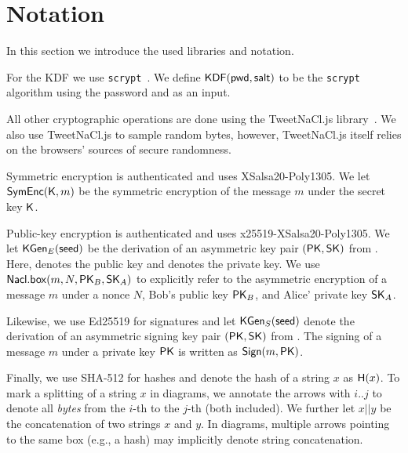 \section{Notation}
\label{sec:notation}

In this section we introduce the used libraries and notation.

For the \ac{KDF} we use \texttt{scrypt}~\cite{Percival2009}.
We define $\myKDF{\mypwd}{\mySalt}$ to be the \texttt{scrypt} algorithm using the password \mypwd and \mySalt as an input.

All other cryptographic operations are done using the TweetNaCl.js library~\cite{Bernstein2015,Chestnykhm2016}.
We also use TweetNaCl.js to sample random bytes, however, TweetNaCl.js itself relies on the browsers' sources of secure randomness.

Symmetric encryption is authenticated and uses XSalsa20-Poly1305.
We let $\mySymEnc{\mySymKey}{m}$ be the symmetric encryption of the message $m$ under the secret key $\mySymKey$.

Public-key encryption is authenticated and uses x25519-XSalsa20-Poly1305.
We let $\myKGen[_E]{\myseed}$ be the derivation of an asymmetric key pair $\myKeyPair{}$  from \myseed.
Here, \myPK denotes the public key and \mySK denotes the private key.
We use $\myAlgofont{Nacl.box}(m, N, \myPK_B, \mySK_A)$ to explicitly refer to the asymmetric encryption of a message $m$ under a nonce $N$, Bob's public key $\myPK_B$, and Alice' private key $\mySK_A$.

Likewise, we use Ed25519 for signatures and let $\myKGen[_S]{\myseed}$ denote the derivation of an asymmetric signing key pair $\myKeyPair{}$  from \myseed.
The signing of a message $m$ under a private key $\myPK$ is written as $\mySign{m}{\myPK}$.

Finally, we use SHA-512 for hashes and denote the hash of a string $x$ as $\myHash{x}$.
To mark a splitting of a string $x$ in diagrams, we annotate the arrows with $i..j$ to denote all \textit{bytes} from the $i$-th to the $j$-th (both included).
We further let $x || y$ be the concatenation of two strings $x$ and $y$.
In diagrams, multiple arrows pointing to the same box (e.g., a hash) may implicitly denote string concatenation.

